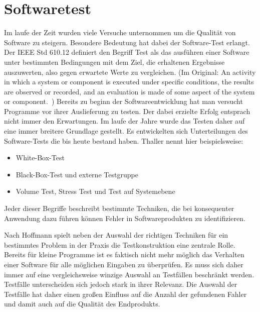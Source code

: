 \section{Softwaretest}
\label{sec:softwaretest}
Im laufe der Zeit wurden viele Versuche unternommen um die Qualität von Software zu steigern. Besondere Bedeutung hat dabei der Software-Test erlangt.
Der IEEE Std 610.12 definiert den Begriff Test als das ausführen einer Software unter bestimmten Bedingungen mit dem Ziel, die erhaltenen Ergebnisse auszuwerten, also gegen erwartete Werte zu vergleichen.
(Im Original: \glqq An activity in which a system or component is executed under specific conditions, the results are observed or recorded, and an evaluation is made of some aspect of the system or component.\grqq\ \cite{ieee_ieee_1991})
Bereits zu beginn der Softwareentwicklung hat man versucht Programme vor ihrer Auslieferung zu testen. Der dabei erzielte Erfolg entsprach nicht immer den Erwartungen. Im laufe der Jahre wurde das Testen daher auf eine immer breitere Grundlage gestellt. Es entwickelten sich Unterteilungen des Software-Tests die bis heute bestand haben. Thaller \cite[vgl. S.18]{thaller_software-test_2002}  nennt hier beispielsweise:
\begin{itemize}
\item White-Box-Test
\item Black-Box-Test und externe Testgruppe
\item Volume Test, Stress Test und Test auf Systemebene
\end{itemize}
Jeder dieser Begriffe beschreibt bestimmte Techniken, die bei konsequenter Anwendung dazu führen können Fehler in Softwareprodukten zu identifizieren. 

Nach Hoffmann \cite[vgl. S.22]{hoffmann_software-qualitat_2013} spielt neben der Auswahl der richtigen Techniken für ein bestimmtes Problem in der Praxis die Testkonstruktion eine zentrale Rolle. Bereits für kleine Programme ist es faktisch nicht mehr möglich das Verhalten einer Software für alle möglichen Eingaben zu überprüfen. Es muss sich daher immer auf eine vergleichsweise winzige Auswahl an Testfällen beschränkt werden. Testfälle unterscheiden sich jedoch stark in ihrer Relevanz. Die Auswahl der Testfälle hat daher einen großen Einfluss auf die Anzahl der gefundenen Fahler und damit auch auf die Qualität des Endprodukts. 

